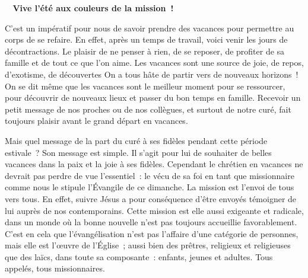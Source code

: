  \begin{center}
 \textbf{
\og 
Vive l’été aux couleurs de la mission !
 \fg{}
 }
 \end{center}

C’est un impératif pour nous de savoir prendre des vacances pour permettre au corps de se refaire. En effet, après un temps de travail, voici venir les jours de décontractions. Le plaisir de ne penser à rien, de se reposer, de profiter de sa famille et de tout ce que l’on aime. Les vacances sont une source de joie, de repos, d’exotisme, de découvertes\cdots{} On a tous hâte de partir vers de nouveaux horizons ! On se dit même que les vacances sont le meilleur moment pour se ressourcer, pour découvrir de nouveaux lieux et passer du bon temps en famille. Recevoir un petit message de nos proches ou de nos collègues, et surtout de notre curé, fait toujours plaisir avant le grand départ en vacances.

Mais quel message de la part du curé à ses fidèles pendant cette période estivale ? Son message est simple. Il s’agit pour lui de souhaiter de belles vacances dans la paix et la joie à ses fidèles.
Cependant le chrétien en vacances ne devrait pas perdre de vue l’essentiel : le vécu de sa foi en tant que missionnaire comme nous le stipule l’Évangile de ce dimanche. La mission est l’envoi de tous vers tous. En effet, suivre Jésus a pour conséquence d’être envoyés témoigner de lui auprès de nos contemporains.
Cette mission est elle aussi exigeante et radicale, dans un monde où la bonne nouvelle n’est pas toujours accueillie favorablement. C’est en cela que l’évangélisation n’est pas l’affaire d’une catégorie de personnes, mais elle est l’œuvre de l’Église ; aussi bien des prêtres, religieux et religieuses que des laïcs, dans toute sa composante : enfants, jeunes et adultes.
Tous appelés, tous missionnaires.

